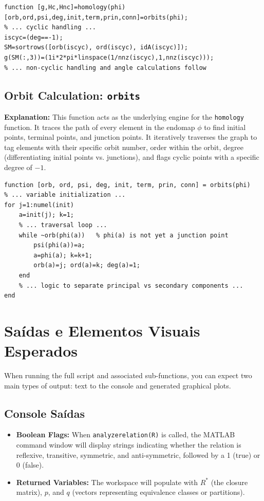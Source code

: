 \begin{lstlisting}[caption={Homology of Endomaps Snippet}]
function [g,Hc,Hnc]=homology(phi)
[orb,ord,psi,deg,init,term,prin,conn]=orbits(phi);
% ... cyclic handling ...
iscyc=(deg==-1);
SM=sortrows([orb(iscyc), ord(iscyc), idA(iscyc)]);
g(SM(:,3))=(1i*2*pi*linspace(1/nnz(iscyc),1,nnz(iscyc)));
% ... non-cyclic handling and angle calculations follow
\end{lstlisting}

\subsection{Orbit Calculation: \texttt{orbits}}
\textbf{Explanation:} This function acts as the underlying engine for the \texttt{homology} function. It traces the path of every element in the endomap $\phi$ to find initial points, terminal points, and junction points. It iteratively traverses the graph to tag elements with their specific orbit number, order within the orbit, degree (differentiating initial points vs. junctions), and flags cyclic points with a specific degree of $-1$.

\begin{lstlisting}[caption={Orbit Calculation Snippet}]
function [orb, ord, psi, deg, init, term, prin, conn] = orbits(phi)
% ... variable initialization ...
for j=1:numel(init)
    a=init(j); k=1;
    % ... traversal loop ...
    while ~orb(phi(a))   % phi(a) is not yet a junction point
        psi(phi(a))=a; 
        a=phi(a); k=k+1;  
        orb(a)=j; ord(a)=k; deg(a)=1;
    end
    % ... logic to separate principal vs secondary components ...
end
\end{lstlisting}

\section{Saídas e Elementos Visuais Esperados}

When running the full script and associated sub-functions, you can expect two main types of output: text to the console and generated graphical plots.

\subsection*{Console Saídas}
\begin{itemize}
    \item \textbf{Boolean Flags:} When \texttt{analyzerelation(R)} is called, the MATLAB command window will display strings indicating whether the relation is reflexive, transitive, symmetric, and anti-symmetric, followed by a 1 (true) or 0 (false).
    \item \textbf{Returned Variables:} The workspace will populate with $R^*$ (the closure matrix), $p$, and $q$ (vectors representing equivalence classes or partitions).
\end{itemize}

